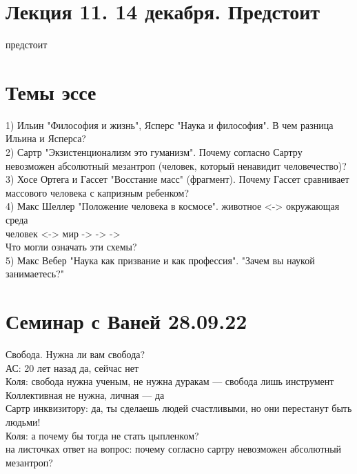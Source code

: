 \documentclass[a4paper,12pt]{article}
\begin{document}
\section{Лекция 11. 14 декабря. Предстоит} предстоит


\section{Темы эссе}
1) Ильин "Философия и жизнь", Ясперс "Наука и философия". В чем разница Ильина и Ясперса?\\
2) Сартр "Экзистенционализм это гуманизм". Почему согласно Сартру невозможен абсолютный мезантроп (человек, который ненавидит человечество)? \\
3) Хосе Ортега и Гассет "Восстание масс" (фрагмент). Почему Гассет сравнивает массового человека с капризным ребенком? \\
4) Макс Шеллер "Положение человека в космосе". 
животное <-> окружающая среда\\
человек  <-> мир -> -> -> \\
Что могли означать эти схемы?\\
5) Макс Вебер "Наука как призвание и как профессия". "Зачем вы наукой занимаетесь?"\\
\section{Семинар с Ваней 28.09.22}
Свобода. Нужна ли вам свобода?\\
АС: 20 лет назад да, сейчас нет \\
Коля: свобода нужна ученым, не нужна дуракам --- свобода лишь инструмент\\
Коллективная не нужна, личная --- да\\
Сартр инквизитору: да, ты сделаешь людей счастливыми, но они перестанут быть людьми!\\
Коля: а почему бы тогда не стать цыпленком?\\
на листочках ответ на вопрос: почему согласно сартру невозможен абсолютный мезантроп? 
\end{document}

